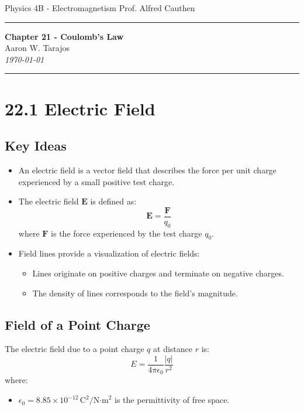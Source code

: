 \documentclass{article}
\begin{document}
\noindent
Physics 4B - Electromagnetism \hfill Prof. Alfred Cauthen

\noindent\rule{\textwidth}{0.4pt}

\begin{center}
    \textbf{\LARGE Chapter 21 - Coulomb's Law} \\
    \vspace{12pt}
    \large Aaron W. Tarajos \\
    \textit{\today}
\end{center}

\noindent\rule{\textwidth}{0.4pt}

\section*{22.1 Electric Field}
\subsection*{Key Ideas}
\begin{itemize}
    \item An electric field is a vector field that describes the force per unit charge experienced by a small positive test charge.
    \item The electric field \( \mathbf{E} \) is defined as:
    \[
    \mathbf{E} = \frac{\mathbf{F}}{q_0}
    \]
    where \( \mathbf{F} \) is the force experienced by the test charge \( q_0 \).
    \item Field lines provide a visualization of electric fields:
    \begin{itemize}
        \item Lines originate on positive charges and terminate on negative charges.
        \item The density of lines corresponds to the field's magnitude.
    \end{itemize}
\end{itemize}

\subsection*{Field of a Point Charge}
The electric field due to a point charge \( q \) at distance \( r \) is:
\[
E = \frac{1}{4 \pi \epsilon_0} \frac{|q|}{r^2}
\]
where:
\begin{itemize}
    \item \( \epsilon_0 = 8.85 \times 10^{-12} \, \text{C}^2 / \text{N·m}^2 \) is the permittivity of free space.
\end{itemize}
\end{document}
